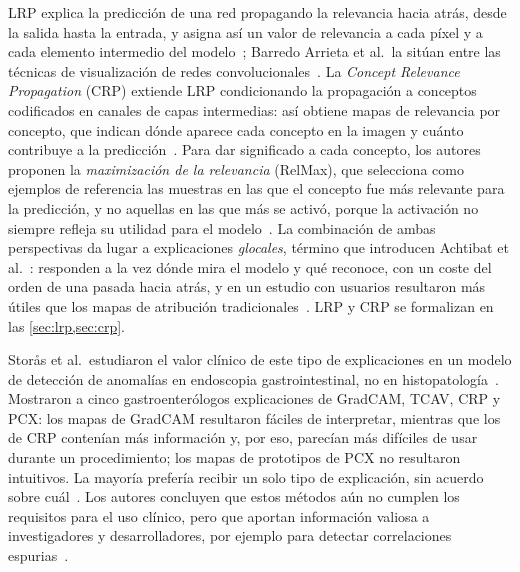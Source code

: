 LRP explica la predicción de una red propagando la relevancia hacia atrás, desde
la salida hasta la entrada, y asigna así un valor de relevancia a cada píxel y a
cada elemento intermedio del modelo~\cite{achtibat2023,bach2015}; Barredo Arrieta
et al.\ la sitúan entre las técnicas de visualización de redes
convolucionales~\cite{barredo2020}. La \emph{Concept Relevance Propagation} (CRP)
extiende LRP condicionando la propagación a conceptos codificados en canales de
capas intermedias: así obtiene mapas de relevancia por concepto, que indican
dónde aparece cada concepto en la imagen y cuánto contribuye a la
predicción~\cite{achtibat2023}. Para dar significado a cada concepto, los autores
proponen la \emph{maximización de la relevancia} (RelMax), que selecciona como
ejemplos de referencia las muestras en las que el concepto fue más relevante para
la predicción, y no aquellas en las que más se activó, porque la activación no
siempre refleja su utilidad para el modelo~\cite{achtibat2023}. La combinación de
ambas perspectivas da lugar a explicaciones \emph{glocales}, término que
introducen Achtibat et al.~\cite{achtibat2023,sevillano2025tesis}: responden a la
vez dónde mira el modelo y qué reconoce, con un coste del orden de una pasada
hacia atrás, y en un estudio con usuarios resultaron más útiles que los mapas de
atribución tradicionales~\cite{achtibat2023}. LRP y CRP se formalizan en las
\cref{sec:lrp,sec:crp}.

Storås et al.\ estudiaron el valor clínico de este tipo de explicaciones en un
modelo de detección de anomalías en endoscopia gastrointestinal, no en
histopatología~\cite{storas2025}. Mostraron a cinco gastroenterólogos
explicaciones de GradCAM, TCAV, CRP y PCX: los mapas de GradCAM resultaron fáciles
de interpretar, mientras que los de CRP contenían más información y, por eso,
parecían más difíciles de usar durante un procedimiento; los mapas de prototipos
de PCX no resultaron intuitivos. La mayoría prefería recibir un solo tipo de
explicación, sin acuerdo sobre cuál~\cite{storas2025}. Los autores concluyen que
estos métodos aún no cumplen los requisitos para el uso clínico, pero que aportan
información valiosa a investigadores y desarrolladores, por ejemplo para detectar
correlaciones espurias~\cite{storas2025}.

